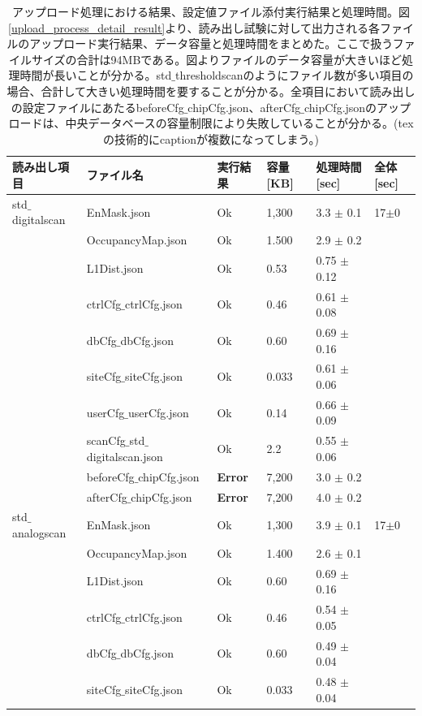 { \scriptsize
\begin{longtable}{|llllll|}
  \caption[アップロード処理における結果、設定値ファイル添付実行結果と処理時間]{アップロード処理における結果、設定値ファイル添付実行結果と処理時間。図\ref{upload_process_detail_result}より、読み出し試験に対して出力される各ファイルのアップロード実行結果、データ容量と処理時間をまとめた。ここで扱うファイルサイズの合計は94MBである。図よりファイルのデータ容量が大きいほど処理時間が長いことが分かる。std$\_$thresholdscanのようにファイル数が多い項目の場合、合計して大きい処理時間を要することが分かる。全項目において読み出しの設定ファイルにあたるbeforeCfg$\_$chipCfg.json、afterCfg$\_$chipCfg.jsonのアップロードは、中央データベースの容量制限により失敗していることが分かる。(texの技術的にcaptionが複数になってしまう。)}
  \label{upload_status_to_pd}
  \endhead
  \hline
  読み出し項目 & ファイル名 & 実行結果 & 容量[KB] & 処理時間[sec] & 全体[sec]\\ 
  \hline
std$\_$digitalscan & EnMask.json & Ok & 1,300 & 3.3 $\pm$ 0.1 & 17$\pm$0 \\
 & OccupancyMap.json & Ok & 1.500 & 2.9 $\pm$ 0.2 & \\
 & L1Dist.json & Ok & 0.53 & 0.75 $\pm$ 0.12 & \\
 & ctrlCfg$\_$ctrlCfg.json & Ok & 0.46 & 0.61 $\pm$ 0.08 & \\
 & dbCfg$\_$dbCfg.json & Ok & 0.60 & 0.69 $\pm$ 0.16 & \\
 & siteCfg$\_$siteCfg.json & Ok & 0.033 & 0.61 $\pm$ 0.06 & \\
 & userCfg$\_$userCfg.json & Ok & 0.14 & 0.66 $\pm$ 0.09 & \\
 & scanCfg$\_$std$\_$digitalscan.json & Ok & 2.2 & 0.55 $\pm$ 0.06 & \\
 & beforeCfg$\_$chipCfg.json & { \bf Error} & 7,200 & 3.0 $\pm$ 0.2 & \\
 & afterCfg$\_$chipCfg.json & { \bf Error} & 7,200 & 4.0 $\pm$ 0.2 & \\
\hline
std$\_$analogscan & EnMask.json & Ok & 1,300 & 3.9 $\pm$ 0.1 & 17$\pm$0\\
 & OccupancyMap.json & Ok & 1.400 & 2.6 $\pm$ 0.1 & \\
 & L1Dist.json & Ok & 0.60 & 0.69 $\pm$ 0.16 & \\
 & ctrlCfg$\_$ctrlCfg.json & Ok & 0.46 & 0.54 $\pm$ 0.05 & \\
 & dbCfg$\_$dbCfg.json & Ok & 0.60 & 0.49 $\pm$ 0.04 & \\
 & siteCfg$\_$siteCfg.json & Ok & 0.033 & 0.48 $\pm$ 0.04 & \\

\end{longtable}}

